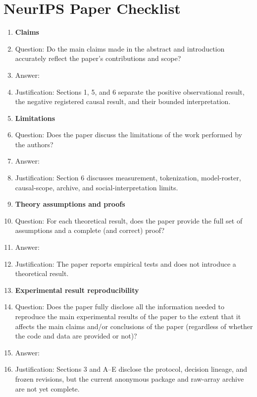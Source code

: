 \section*{NeurIPS Paper Checklist}

\begin{enumerate}

\item {\bf Claims}
  \item[] Question: Do the main claims made in the abstract and introduction accurately reflect the paper's contributions and scope?
  \item[] Answer: \answerYes{}
  \item[] Justification: Sections 1, 5, and 6 separate the positive observational result, the negative registered causal result, and their bounded interpretation.

\item {\bf Limitations}
  \item[] Question: Does the paper discuss the limitations of the work performed by the authors?
  \item[] Answer: \answerYes{}
  \item[] Justification: Section 6 discusses measurement, tokenization, model-roster, causal-scope, archive, and social-interpretation limits.

\item {\bf Theory assumptions and proofs}
  \item[] Question: For each theoretical result, does the paper provide the full set of assumptions and a complete (and correct) proof?
  \item[] Answer: \answerNA{}
  \item[] Justification: The paper reports empirical tests and does not introduce a theoretical result.

\item {\bf Experimental result reproducibility}
  \item[] Question: Does the paper fully disclose all the information needed to reproduce the main experimental results of the paper to the extent that it affects the main claims and/or conclusions of the paper (regardless of whether the code and data are provided or not)?
  \item[] Answer: \answerNo{}
  \item[] Justification: Sections 3 and A--E disclose the protocol, decision lineage, and frozen revisions, but the current anonymous package and raw-array archive are not yet complete.


\end{enumerate}
